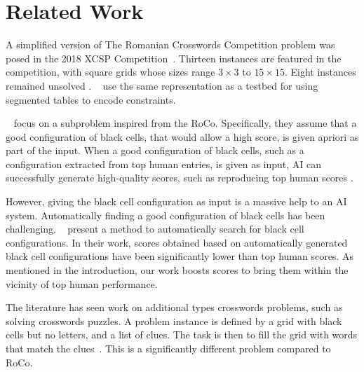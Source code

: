 \section{Related Work}
\label{sec::relwork}

A simplified version of The Romanian Crosswords Competition problem was posed
in the 2018 XCSP Competition~\cite{DBLP:journals/corr/abs-1901-01830}.
Thirteen instances are featured in the competition, 
with square grids whose sizes range $3 \times 3$ to $15 \times 15$.
Eight instances remained unsolved \cite{DBLP:journals/corr/abs-1901-01830}.
\citeauthor{DBLP:conf/ecai/AudemardLM20}~
use the same representation
as a testbed for using segmented tables
to encode constraints.

\citeauthor{DBLP:conf/socs/BoteaB21}~
focus on a subproblem inspired from the {\sc RoCo}.
Specifically, they assume that 
a good configuration of black cells,
that would allow a high score,
is given apriori as part of the input.
When a good configuration of black cells,
such as a configuration extracted from top human entries,
is given as input, AI can successfully generate high-quality scores,
such as reproducing top human scores \cite{DBLP:conf/socs/BoteaB21}.

However, giving the black cell configuration as input is a massive help to an AI system.
Automatically finding a good configuration of black cells
has been challenging. 
\citeauthor{DBLP:conf/cig/BulitkoB21}~
present a method to automatically search for black cell configurations.
In their work, scores obtained based on automatically generated
black cell configurations have been significantly lower than 
top human scores.
As mentioned in the introduction, our work boosts scores
to bring them within the vicinity of top human performance.


The literature has seen work on additional types crosswords problems,
such as solving crosswords puzzles.
A problem instance is defined by a grid with black cells but no letters,
and a list of clues.
The task is then to fill the grid with words that match the 
clues~\cite{DBLP:journals/ai/LittmanKS02,DBLP:conf/aaai/ErnandesAG05,DBLP:journals/jair/Ginsberg11,Chen-icaps22}.
This is a significantly different problem compared to {\sc RoCo}.


\begin{comment}
The problem of \emph{crosswords grid generation} takes as input
a list of words and
a grid with only black cells.
The task is to fill the grid with words from the
list~\cite{MAZLACK19761,10.5555/1865499.1865531,botea-modref07,anbulagan-botea-cp08}.
As mentioned in the introduction and in Section~\ref{sec::background}, {\sc Roco}
is a significant generalization of the standard crosswords grid generation.
\end{comment}